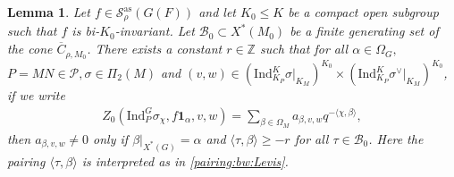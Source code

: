 \documentclass[10pt]{amsart}
\newtheorem{lemma}[theorem]{Lemma}
\theoremstyle{definition}
\numberwithin{equation}{section}
\numberwithin{equation}{subsection}
\newcommand{\Ind}{\mathrm{Ind}}
\newcommand{\calB}{\mathcal{B}}
\begin{document}
\begin{lemma}\label{alpha:supp:1} Let $f\in\mathcal{S}_\rho^{\mathrm{as}}(G(F))$ and let $K_0\leq K$ be a compact open subgroup such that $f$ is bi-$K_0$-invariant. Let  $\calB_0\subset X^\ast(M_0)$ be a finite generating set of the cone $\overline{C}_{\rho,M_0}$. There exists a constant $r\in\mathbb{Z}$ such that for all $\alpha\in \Omega_G,$   $P=MN\in \mathcal{P}, \sigma\in\Pi_2(M)$ and $(v,w)\in(\Ind_{K_P}^K\sigma\vert_{K_M})^{K_0}\times(\Ind_{K_P}^K\sigma^\vee\vert_{K_M})^{K_0}$, if we write
    \begin{align*}
        Z_0(\Ind_P^G\sigma_\chi,f\mathbf{1}_\alpha,v,w) = \sum_{\beta\in\Omega_M} a_{\beta,v,w} q^{-\langle\chi,\beta\rangle},
    \end{align*}
    then $a_{\beta,v,w}\neq 0$ only if $\beta\vert_{X^*(G)} = \alpha$ and $\langle\tau,\beta\rangle\geq -r$ for all $\tau\in\mathcal{B}_0$. Here the pairing $\langle\tau,\beta\rangle$ is interpreted as in  \eqref{pairing:bw:Levis}.
\end{lemma}
\end{document}
